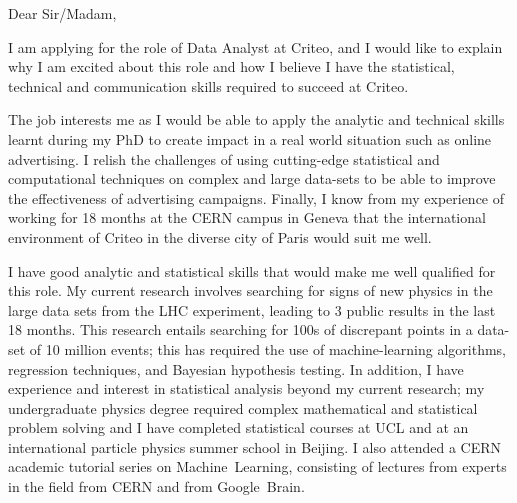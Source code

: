 \documentclass[]{letter}
\begin{document}

\begin{letter}{}  %
  \address{    %
    123 Tyers Street,\\
    London, \\
    SE11 5HS,\\
    UK\vspace{-1em}
  }
  \signature{\vspace{-1.2cm}Laurie McClymont}
  \opening{Dear Sir/Madam,}
  \vspace{1mm}

I am applying for the role of Data Analyst at Criteo, and I would like to explain why I am excited about this role and
how I believe I have the statistical, technical and communication skills required to succeed at Criteo.

The job interests me as I would be able to apply the analytic and technical skills learnt during my PhD
to create impact in a real world situation such as online advertising.
I relish the challenges of using cutting-edge statistical and computational techniques on complex and large data-sets to be able
to improve the effectiveness of advertising campaigns.
Finally, I know from my experience of working for 18 months at the CERN campus in Geneva
that the international environment of Criteo in the diverse city of Paris would suit me well.

I have good analytic and statistical skills that would make me well qualified for this role.
My current research involves searching for signs of new physics in the large data sets from the LHC experiment,
leading to 3 public results in the last 18 months.
This research entails searching for 100s of discrepant points in a data-set of 10 million events;
this has required the use of machine-learning algorithms, regression techniques, and  Bayesian hypothesis testing.
In addition, I have experience and interest in statistical analysis beyond my current research;
my undergraduate physics degree required complex mathematical and statistical problem solving
and I have completed statistical courses at UCL and at an international particle physics summer school in Beijing.
I also attended a CERN academic tutorial series on Machine~Learning,
consisting of lectures from experts in the field from CERN and from Google~Brain.


\end{letter}
\end{document}
